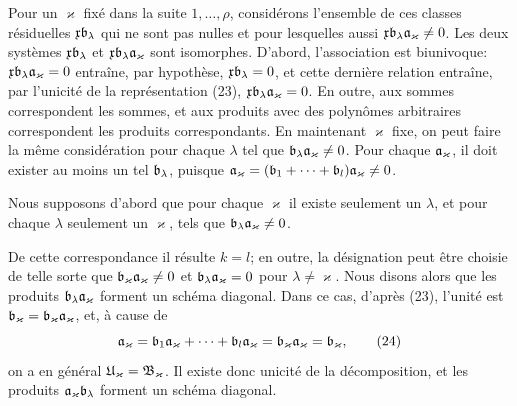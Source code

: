 Pour un $\varkappa$ fixé dans la suite $1,\ldots,\rho$, considérons l'ensemble de ces classes résiduelles $\mathfrak{x}\mathfrak{b}_\lambda$ qui ne sont pas nulles et pour lesquelles aussi $\mathfrak{x}\mathfrak{b}_\lambda\mathfrak{a}_\varkappa\ne0$. Les deux systèmes $\mathfrak{x}\mathfrak{b}_\lambda$ et $\mathfrak{x}\mathfrak{b}_\lambda\mathfrak{a}_\varkappa$ sont isomorphes. D'abord, l'association est biunivoque: $\mathfrak{x}\mathfrak{b}_\lambda\mathfrak{a}_\varkappa=0$ entraîne, par hypothèse, $\mathfrak{x}\mathfrak{b}_\lambda=0$, et cette dernière relation entraîne, par l'unicité de la représentation (23), $\mathfrak{x}\mathfrak{b}_\lambda\mathfrak{a}_\varkappa=0$. En outre, aux sommes correspondent les sommes, et aux produits avec des polynômes arbitraires correspondent les produits correspondants. En maintenant $\varkappa$ fixe, on peut faire la même considération pour chaque $\lambda$ tel que $\mathfrak{b}_\lambda\mathfrak{a}_\varkappa\ne0$. Pour chaque $\mathfrak{a}_\varkappa$, il doit exister au moins un tel $\mathfrak{b}_\lambda$, puisque $\mathfrak{a}_\varkappa=(\mathfrak{b}_1+\cdots+\mathfrak{b}_l)\mathfrak{a}_\varkappa\ne0$.

Nous supposons d'abord que pour chaque $\varkappa$ il existe seulement un $\lambda$, et pour chaque $\lambda$ seulement un $\varkappa$, tels que $\mathfrak{b}_\lambda\mathfrak{a}_\varkappa\ne0$.

De cette correspondance il résulte $k=l$; en outre, la désignation peut être choisie de telle sorte que $\mathfrak{b}_\varkappa\mathfrak{a}_\varkappa\ne0$ et $\mathfrak{b}_\lambda\mathfrak{a}_\varkappa=0$ pour $\lambda\ne\varkappa$. Nous disons alors que les produits $\mathfrak{b}_\lambda\mathfrak{a}_\varkappa$ forment un schéma diagonal. Dans ce cas, d'après (23), l'unité est $\mathfrak{b}_\varkappa=\mathfrak{b}_\varkappa\mathfrak{a}_\varkappa$, et, à cause de
\begin{equation}
 \mathfrak{a}_\varkappa=\mathfrak{b}_1\mathfrak{a}_\varkappa+\cdots+\mathfrak{b}_l\mathfrak{a}_\varkappa=\mathfrak{b}_\varkappa\mathfrak{a}_\varkappa=\mathfrak{b}_\varkappa,
\tag{24}
\end{equation}
on a en général $\mathfrak{U}_\varkappa=\mathfrak{B}_\varkappa$. Il existe donc unicité de la décomposition, et les produits $\mathfrak{a}_\varkappa\mathfrak{b}_\lambda$ forment un schéma diagonal.

